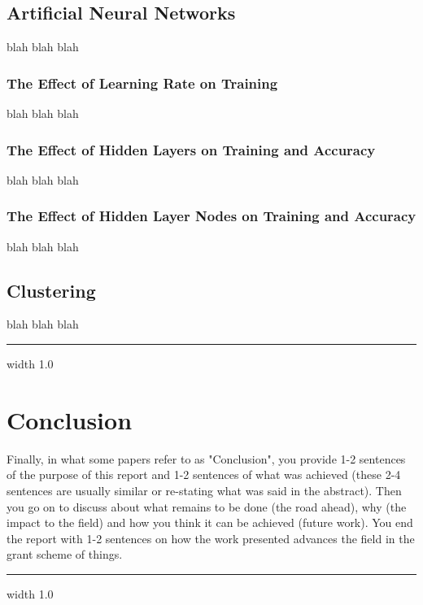 \documentclass[12pt]{article}
\newcommand{\horizontalLine}{
	\begin{center}
		\hrule width 1.0\textwidth
	\end{center}
}
\begin{document}
\subsection{Artificial Neural Networks}
\label{subsec:annResults}
blah blah blah

\subsubsection{The Effect of Learning Rate on Training}
\label{subsubsec:annLearningRateResults}
blah blah blah

\subsubsection{The Effect of Hidden Layers on Training and Accuracy}
\label{subsubsec:annHiddenLayerResults}
blah blah blah

\subsubsection{The Effect of Hidden Layer Nodes on Training and Accuracy}
\label{subsubsec:annHiddenLayerNodesResults}
blah blah blah

\subsection{Clustering}
\label{subsec:kMeansResults}
blah blah blah

\horizontalLine
\section{Conclusion}
\label{sec:conclusion}
Finally, in what some papers refer to as "Conclusion", you provide 1-2 sentences of the purpose
of this report and 1-2 sentences of what was achieved (these 2-4 sentences are usually similar
or re-stating what was said in the abstract). Then you go on to discuss about what remains to
be done (the road ahead), why (the impact to the field) and how you think it can be achieved
(future work). You end the report with 1-2 sentences on how the work presented advances the
field in the grant scheme of things.

\horizontalLine
\end{document}
